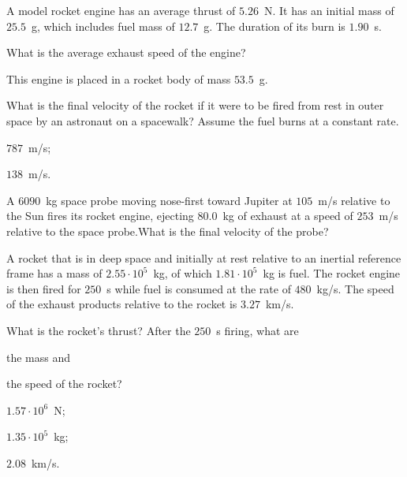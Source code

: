 \begin{problem}
	A model rocket engine has an average thrust of $5.26$~N. It has an initial mass of $25.5$~g, which includes fuel mass of $12.7$~g. The duration of its burn is $1.90$~s.
	\begin{enumerate*}[label=(\alph*)]
		\item What is the average exhaust speed of the engine?
		\item This engine is placed in a rocket body of mass $53.5$~g.
	\end{enumerate*}
	 What is the final velocity of the rocket if it were to be fired from rest in outer space by an astronaut on a spacewalk? Assume the fuel burns at a constant rate.
	\begin{solution}
		\begin{enumerate*}[label=(\alph*)]
			\item $787$~m/s; 
			\item $138$~m/s.
		\end{enumerate*}
	\end{solution}
\end{problem}


\begin{problem}
	A $6090$~kg space probe moving nose-first toward Jupiter at $105$~m/s relative to the Sun fires its rocket engine, ejecting $80.0$~kg of exhaust at a speed of $253$~m/s relative to the space probe.What is the final velocity of the probe?
\end{problem}


\begin{problem}
	A rocket that is in deep space and initially at rest relative to an inertial reference frame has a mass of $2.55 \cdot 10^5$~kg, of which $1.81  \cdot 10^5$~kg is fuel. The rocket engine is then fired for $250$~s while fuel is consumed at the rate of $480$~kg/s. The speed of the exhaust products relative to the rocket is $3.27$~km/s. 
	\begin{enumerate*}[label=(\alph*)]
		\item What is the rocket’s thrust? After the $250$~s firing,
		what are
		\item the mass 
		and
		\item the speed of the rocket?
	\end{enumerate*}
	\begin{solution}
		\begin{enumerate*}[label=(\alph*)]
			\item $1.57 \cdot 10^6$~N;
			\item $1.35 \cdot 10^5$~kg; 
			\item $2.08$~km/s.
		\end{enumerate*}
	\end{solution}
\end{problem}



